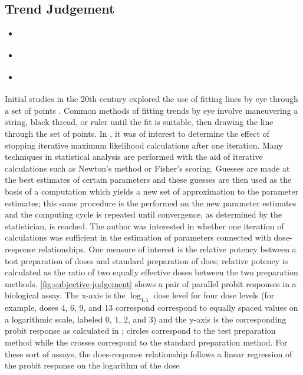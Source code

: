 \documentclass[12pt]{article}
\providecommand{\tightlist}{%
  \setlength{\itemsep}{0pt}\setlength{\parskip}{0pt}}
\begin{document}
\hypertarget{trend-judgement}{%
\subsection{Trend Judgement}\label{trend-judgement}}

\begin{itemize}
\tightlist
\item
  \citet{finney1951subjective}
\item
  \citet{mosteller_eye_1981}
\item
  \citet{ciccione2021can}
\end{itemize}

Initial studies in the 20th century explored the use of fitting lines by
eye through a set of points
\citep{finney1951subjective, mosteller_eye_1981}. Common methods of
fitting trends by eye involve maneuvering a string, black thread, or
ruler until the fit is suitable, then drawing the line through the set
of points. In \citet{finney1951subjective}, it was of interest to
determine the effect of stopping iterative maximum likelihood
calculations after one iteration. Many techniques in statistical
analysis are performed with the aid of iterative calculations such as
Newton's method or Fisher's scoring. Guesses are made at the best
estimates of certain parameters and these guesses are then used as the
basis of a computation which yields a new set of approximation to the
parameter estimates; this same procedure is the performed on the new
parameter estimates and the computing cycle is repeated until
convergence, as determined by the statistician, is reached. The author
was interested in whether one iteration of calculations was sufficient
in the estimation of parameters connected with dose-response
relationships. One measure of interest is the relative potency between a
test preparation of doses and standard preparation of does; relative
potency is calculated as the ratio of two equally effective doses
between the two preparation methods. \cref{fig:subjective-judgement}
shows a pair of parallel probit responses in a biological assay. The
x-axis is the \(\log_{1.5}\) dose level for four dose levels (for
example, doses 4, 6, 9, and 13 correspond correspond to equally spaced
values on a logarithmic scale, labeled 0, 1, 2, and 3) and the y-axis is
the corresponding probit response as calculated in
\citet{finney1948table}; circles correspond to the test preparation
method while the crosses correspond to the standard preparation method.
For these sort of assays, the does-response relationship follows a
linear regression of the probit response on the logarithm of the dose
\end{document}
